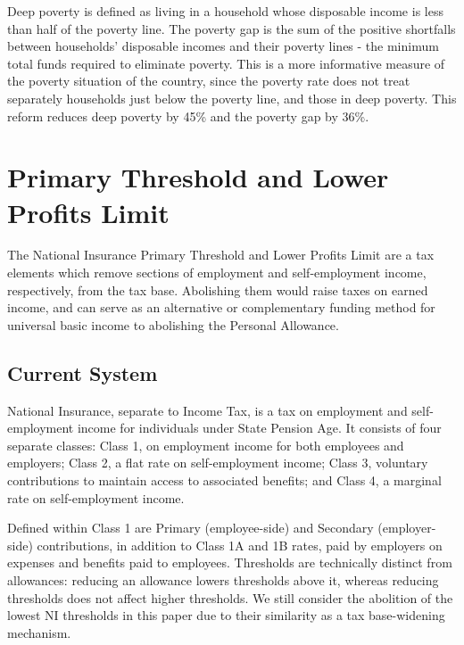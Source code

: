 \documentclass{article}
\begin{document}
    Deep poverty is defined as living in a household whose disposable income is less than half of the poverty line. The poverty gap is the sum of the positive shortfalls between households' disposable incomes and their poverty lines - the minimum total funds required to eliminate poverty. This is a more informative measure of the poverty situation of the country, since the poverty rate does not treat separately households just below the poverty line, and those in deep poverty. This reform reduces deep poverty by 45\% and the poverty gap by 36\%.

    \section{Primary Threshold and Lower Profits Limit}

    The National Insurance Primary Threshold and Lower Profits Limit are a tax elements which remove sections of employment and self-employment income, respectively, from the tax base. Abolishing them would raise taxes on earned income, and can serve as an alternative or complementary funding method for universal basic income to abolishing the Personal Allowance.

    \subsection{Current System}
    National Insurance, separate to Income Tax, is a tax on employment and self-employment income for individuals under State Pension Age. It consists of four separate classes: Class 1, on employment income for both employees and employers; Class 2, a flat rate on self-employment income; Class 3, voluntary contributions to maintain access to associated benefits; and Class 4, a marginal rate on self-employment income.

    Defined within Class 1 are Primary (employee-side) and Secondary (employer-side) contributions, in addition to Class 1A and 1B rates, paid by employers on expenses and benefits paid to employees. Thresholds are technically distinct from allowances: reducing an allowance lowers thresholds above it, whereas reducing thresholds does not affect higher thresholds. We still consider the abolition of the lowest NI thresholds in this paper due to their similarity as a tax base-widening mechanism. 
\end{document}
